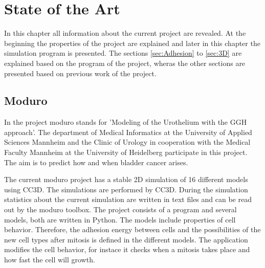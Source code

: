 \chapter{State of the Art}
In this chapter all information about the current project are revealed. At the beginning the properties of the project are explained and later in this chapter the simulation program is presented. The sections \ref{sec:Adhesion} to \ref{sec:3D} are explained based on the program of the project, wheras the other sections are presented based on previous work of the project.

\section{Moduro}
In the project moduro stands for 'Modeling of the Urothelium with the \ac{GGH} approach'. The department of Medical Informatics at the University of Applied Sciences Mannheim and the Clinic of Urology in cooperation with the Medical Faculty Mannheim at the University of Heidelberg participate in this project. The aim is to predict how and when bladder cancer arises.

The current moduro project has a stable 2D simulation of 16 different models using \ac{CC3D}. The simulations are performed by \ac{CC3D}. During the simulation statistics about the current simulation are written in text files and can be read out by the moduro toolbox. \newline
The project consists  of a program and several models, both are written in Python. The models include properties of cell behavior. Therefore, the adhesion energy between cells and the possibilities of the new cell types after mitosis is defined in the different models. The application modifies the cell behavior, for instace it checks when a mitosis takes place and how fast the cell will growth.

